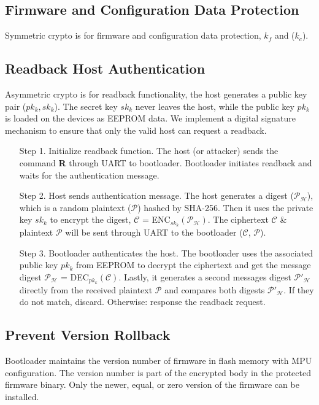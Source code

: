 \documentclass[11pt,oneside,onecolumn,letterpaper]{article}
\begin{document}
\subsection{Firmware and Configuration Data Protection}
Symmetric crypto is for firmware and configuration data protection, $k_f$ and ($k_c$).

\subsection{Readback Host Authentication}
Asymmetric crypto is for readback functionality, the host generates a public key pair ($pk_k, sk_k$).
The secret key $sk_k$ never leaves the host, while the public key $pk_k$ is loaded on the devices as EEPROM data.
We implement a digital signature mechanism to ensure that only the valid host can request a readback.
\begin{itemize}
  \item[Step 1.] Initialize readback function. 
  The host (or attacker) sends the command \textbf{R} through UART to bootloader.
  Bootloader initiates readback and waits for the authentication message.  
  \item[Step 2.] Host sends authentication message.
  The host generates a digest ($\mathcal{P_H}$), which is a random plaintext ($\mathcal{P}$) hashed by SHA-256.
  Then it uses the private key $sk_k$ to encrypt the digest, $\mathcal{C}$ = ENC$_{sk_k}(\mathcal{P_H})$.
  The ciphertext $\mathcal{C}$ \& plaintext $\mathcal{P}$ will be sent through UART to the bootloader ($\mathcal{C}$, $\mathcal{P}$).
  \item[Step 3.] Bootloader authenticates the host.
  The bootloader uses the associated public key $pk_k$ from EEPROM to decrypt the ciphertext and get the message digest $\mathcal{P_H}$ = DEC$_{pk_k}(\mathcal{C})$.
  Lastly, it generates a second messages digest $\mathcal{P'_H}$ directly from the received plaintext $\mathcal{P}$ and compares both digests $\mathcal{P'_H}$.
  If they do not match, discard.
  Otherwise: response the readback request.
\end{itemize}

\subsection{Prevent Version Rollback}
Bootloader maintains the version number of firmware in flash memory with MPU configuration.
The version number is part of the encrypted body in the protected firmware binary.
Only the newer, equal, or zero version of the firmware can be installed.
\end{document}
